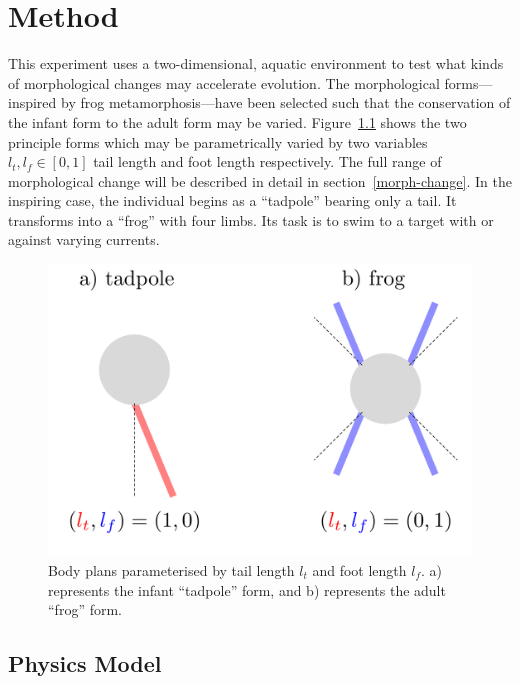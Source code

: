 \chapter{Method}

This experiment uses a two-dimensional, aquatic environment to test
what kinds of morphological changes may accelerate evolution. The
morphological forms---inspired by frog metamorphosis---have been
selected such that the conservation of the infant form to the adult
form may be varied. Figure~\ref{morphology} shows the two principle
forms which may be parametrically varied by two variables $l_t, l_f
\in [0, 1]$ tail length and foot length respectively.  The full range
of morphological change will be described in detail in
section~\ref{morph-change}.  In the inspiring case, the individual
begins as a ``tadpole'' bearing only a tail. It transforms into a
``frog'' with four limbs. Its task is to swim to a target with or
against varying currents.

\begin{figure}[h]
  \centering
  \includegraphics[scale=0.4]{fig/forms.pdf} 
  \vspace{-30pt}
  \caption[Body plans]{\label{morphology}Body plans parameterised by
    tail length $l_t$ and foot length $l_f$. a) represents the infant
    ``tadpole'' form, and b) represents the adult ``frog'' form. }
\end{figure}

\section{Physics Model}


